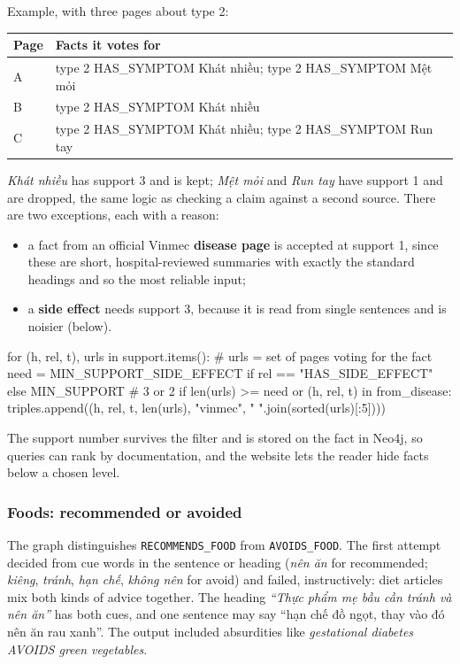 \documentclass[11pt, a4paper]{article}
\newcommand{\code}[1]{\texttt{#1}}
\begin{document}
Example, with three pages about type 2:

\begin{center}
\small
\begin{tabular}{ll}
\toprule
Page & Facts it votes for \\
\midrule
A & type 2 HAS\_SYMPTOM Khát nhiều; type 2 HAS\_SYMPTOM Mệt mỏi \\
B & type 2 HAS\_SYMPTOM Khát nhiều \\
C & type 2 HAS\_SYMPTOM Khát nhiều; type 2 HAS\_SYMPTOM Run tay \\
\bottomrule
\end{tabular}
\end{center}

\emph{Khát nhiều} has support 3 and is kept; \emph{Mệt mỏi} and \emph{Run tay} have support 1 and are dropped, the same logic as checking a claim against a second source. There are two exceptions, each with a reason:
\begin{itemize}
    \item a fact from an official Vinmec \textbf{disease page} is accepted at support 1, since these are short, hospital-reviewed summaries with exactly the standard headings and so the most reliable input;
    \item a \textbf{side effect} needs support 3, because it is read from single sentences and is noisier (below).
\end{itemize}

\begin{codeblock}
for (h, rel, t), urls in support.items():                 # urls = set of pages voting for the fact
    need = MIN_SUPPORT_SIDE_EFFECT if rel == "HAS_SIDE_EFFECT" else MIN_SUPPORT   # 3 or 2
    if len(urls) >= need or (h, rel, t) in from_disease:
        triples.append((h, rel, t, len(urls), "vinmec", " ".join(sorted(urls)[:5])))
\end{codeblock}

The support number survives the filter and is stored on the fact in Neo4j, so queries can rank by documentation, and the website lets the reader hide facts below a chosen level.

\subsubsection{Foods: recommended or avoided}

The graph distinguishes \code{RECOMMENDS\_FOOD} from \code{AVOIDS\_FOOD}. The first attempt decided from cue words in the sentence or heading (\emph{nên ăn} for recommended; \emph{kiêng}, \emph{tránh}, \emph{hạn chế}, \emph{không nên} for avoid) and failed, instructively: diet articles mix both kinds of advice together. The heading \emph{``Thực phẩm mẹ bầu cần tránh và nên ăn''} has both cues, and one sentence may say ``hạn chế đồ ngọt, thay vào đó nên ăn rau xanh''. The output included absurdities like \emph{gestational diabetes AVOIDS green vegetables}.
\end{document}
